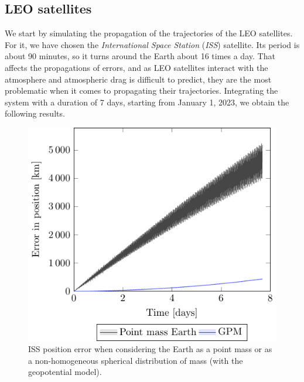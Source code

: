\documentclass[../main.tex]{subfiles}
\begin{document}
\subsection{LEO satellites}
We start by simulating the propagation of the trajectories of the LEO satellites. For it, we have chosen the \emph{International Space Station} (\emph{ISS}) satellite. Its period is about 90 minutes, so it turns around the Earth about 16 times a day. That affects the propagations of errors, and as LEO satellites interact with the atmosphere and atmospheric drag is difficult to predict, they are the most problematic when it comes to propagating their trajectories. Integrating the system with a duration of 7 days, starting from January 1, 2023, we obtain the following results.
\begin{figure}[htbp]
  \centering
  \begin{minipage}[ht]{0.45\textwidth}
    \centering
    \includegraphics[width=\textwidth]{Images/simulation/ISS_pointMass_comparison.pdf}
    \caption{ISS position error when considering the Earth as a point mass or as a non-homogeneous spherical distribution of mass (with the geopotential model).}
    \label{fig:ISS_point}
  \end{minipage}
  \hspace{0.0333333\textwidth}
  \begin{minipage}[ht]{0.45\textwidth}
    \centering

\end{minipage}
\end{figure}
\end{document}

